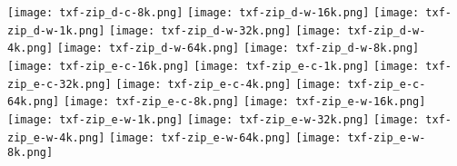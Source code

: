 \documentclass{article}
\begin{document}
\texttt{[image: txf-zip\_d-c-8k.png]}
\texttt{[image: txf-zip\_d-w-16k.png]}
\texttt{[image: txf-zip\_d-w-1k.png]}
\texttt{[image: txf-zip\_d-w-32k.png]}
\texttt{[image: txf-zip\_d-w-4k.png]}
\texttt{[image: txf-zip\_d-w-64k.png]}
\texttt{[image: txf-zip\_d-w-8k.png]}
\texttt{[image: txf-zip\_e-c-16k.png]}
\texttt{[image: txf-zip\_e-c-1k.png]}
\texttt{[image: txf-zip\_e-c-32k.png]}
\texttt{[image: txf-zip\_e-c-4k.png]}
\texttt{[image: txf-zip\_e-c-64k.png]}
\texttt{[image: txf-zip\_e-c-8k.png]}
\texttt{[image: txf-zip\_e-w-16k.png]}
\texttt{[image: txf-zip\_e-w-1k.png]}
\texttt{[image: txf-zip\_e-w-32k.png]}
\texttt{[image: txf-zip\_e-w-4k.png]}
\texttt{[image: txf-zip\_e-w-64k.png]}
\texttt{[image: txf-zip\_e-w-8k.png]}
\end{document}
